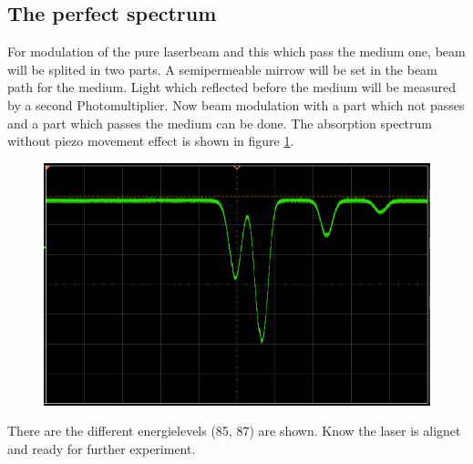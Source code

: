 \subsection{The perfect spectrum}%
\label{sub:the_perfect_spectrum}

For modulation of the pure laserbeam and this which pass the medium one, beam
will be splited in two parts. 
A semipermeable mirrow will be set in the beam path for the medium. 
Light which reflected before the medium will be measured by a second Photomultiplier.
Now beam modulation with a part which not passes and a part which passes the
medium can be done. 
The absorption spectrum without piezo movement effect is shown in figure
\ref{fig:modulation}.
\begin{figure}[h]
		\centering
		\includegraphics[width=0.8\linewidth]{./content/pictures/scope_140.png}
		\caption{}
		\label{fig:modulation}
\end{figure}
There are the different energielevels (85, 87) are
shown.
Know the laser is alignet and ready for further experiment.
